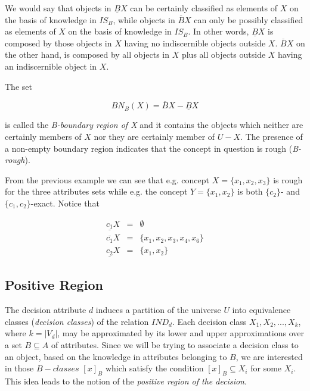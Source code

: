 \documentclass[authoryear,11pt]{elsarticle}
\begin{document}
  We would say that objects in $\underline{B}X$ can be certainly classified as elements of $X$ on the 
  basis of knowledge in $IS_B$, while objects in $\overline{B}X$ can only be possibly classified as 
  elements of $X$ on the basis of knowledge in $IS_B$. In other words, $\underline{B}X$ is 
  composed by those objects in $X$ having no indiscernible objects outside $X$. $\overline{B}X$ on the 
  other hand, is composed by all objects in $X$ plus all objects outside $X$ having an indiscernible 
  object in $X$.
  
  The set 
  
  \begin{equation}
  	BN_B(X)=\overline{B}X-\underline{B}X
  \end{equation}
  
  is called the \textit{B-boundary region of X} and it contains the objects which neither are certainly 
  members of $X$ nor they are certainly member of $U-X$. The presence of a non-empty boundary region
  indicates that the concept in question is rough (\textit{B-rough}).
  
  From the previous example we can see that e.g. concept $X=\lbrace x_1,x_2,x_3 \rbrace$ is rough for the 
  three attributes sets while e.g. the concept $Y=\lbrace x_1,x_2 \rbrace$ is both $\lbrace c_2 \rbrace$-
  and $\lbrace c_1, c_2 \rbrace$-exact. Notice that
  
  $$\begin{array}{lcc}
  \underline{c_1}X &=& \emptyset\\
  \overline{c_1}X  &=& \lbrace x_1,x_2,x_3,x_4,x_6 \rbrace\\
  \underline{c_2}X &=& \lbrace x_1,x_2 \rbrace
  \end{array}$$
  
\subsection{Positive Region}\label{subsect_Pos}
  The decision attribute $d$ induces a partition of the universe $U$ into equivalence classes 
  (\textit{decision classes}) of the relation $IND_d$. Each decision class $X_1,X_2,...,X_k$, where 
  $k=|V_d|$, may be approximated by its lower and upper approximations over a set $B \subseteq A$ of 
  attributes. Since we will be trying to associate a decision class to an object, based on the 
  knowledge in attributes belonging to $B$, we are interested in those $B-classes$ $[x]_B$ which 
  satisfy the condition $[x]_B \subseteq X_i$ for some $X_i$. This idea leads to the notion of the 
  \textit{positive region of the decision}.
  
\end{document}
